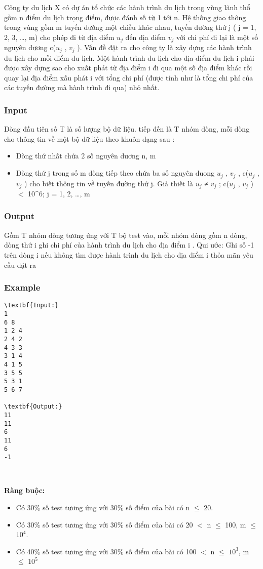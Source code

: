 

Công ty du lịch X có dự án tổ chức các hành trình du lịch trong vùng lãnh thổ gồm n điểm du lịch trọng điểm, được đánh số từ 1 tới n. Hệ thống giao thông trong vùng gồm m tuyến đường một chiều khác nhau, tuyến đường thứ j ( j = 1, 2, 3, …, m) cho phép đi từ địa diểm $u_{j}$ đến dịa diểm $v_{j}$ với chi phí đi lại là một số nguyên dương c($u_{j}$ , $v_{j}$ ). Vấn đề đặt ra cho công ty là xây dựng các hành trình du lịch cho mỗi điểm du lịch. Một hành trình du lịch cho địa điểm du lịch i phải được xây dựng sao cho xuất phát từ địa điểm i đi qua một số địa điểm khác rồi quay lại địa điểm xấu phát i với tổng chi phí (được tính như là tổng chi phí của các tuyến đường mà hành trình đi qua) nhỏ nhất.

\subsubsection{Input}

Dòng đầu tiên số T là số lượng bộ dữ liệu. tiếp đến là T nhóm dòng, mỗi dòng cho thông tin về một bộ dữ liệu theo khuôn dạng sau :
\begin{itemize}
	\item Dòng thứ nhất chứa 2 số nguyên dương n, m
	\item Dòng thứ j trong số m dòng tiếp theo chứa ba số nguyên duong $u_{j}$ , $v_{j}$ , c($u_{j}$ , $v_{j}$ ) cho biết thông tin về tuyến đường thứ j. Giả thiết là $u_{j}$ ≠ $v_{j}$ ; c($u_{j}$ , $v_{j}$ ) $<$ 10^6; j = 1, 2, …, m
\end{itemize}

\subsubsection{Output}

Gồm T nhóm dòng tương ứng với T bộ test vào, mỗi nhóm dòng gồm n dòng, dòng thứ i ghi chi phí của hành trình du lịch cho địa điểm i . Qui ước: Ghi số -1 trên dòng i nếu không tìm được hành trình du lịch cho địa điểm i thỏa mãn yêu cầu đặt ra

\subsubsection{Example}
\begin{verbatim}
\textbf{Input:}
1
6 8
1 2 4
2 4 2
4 3 3
3 1 4
4 1 5
3 5 5
5 3 1
5 6 7

\textbf{Output:}
11
11
6
11
6
-1\end{verbatim}

 

\textbf{Ràng buộc:}
\begin{itemize}
	\item Có 30\% số test tương ứng với 30\% số điểm của bài có n  $\le$  20.
	\item Có 30\% số test tương ứng với 30\% số điểm của bài có 20 $<$ n  $\le$  100, m  $\le$  $10^{4}$.
	\item Có 40\% số test tương ứng với 30\% số điểm của bài có 100 $<$ n  $\le$  $10^{3}$, m  $\le$  $10^{5}$
\end{itemize}
\begin{itemize}
\end{itemize}
